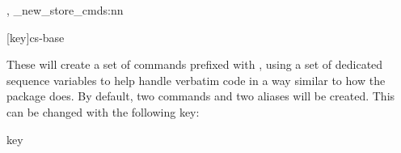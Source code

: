 \documentclass[10pt]{article}
\begin{document}
\begin{codedescribe}{\cvNewStoreCommands , \codeverb_new_store_cmds:nn}
\begin{codesyntax}%
\tsmacro{\cvNewStoreCommands}[key]{cs-base}
\end{codesyntax}
These will create a set of commands prefixed with , using a set of dedicated  sequence variables to help handle verbatim code in a way similar to how the package  does.  By default, two  commands  and two \LaTeXe{} aliases will be created. This can be changed with the following key:

\begin{describelist*}{key}
\end{describelist*}
\end{codedescribe}
\end{document}
